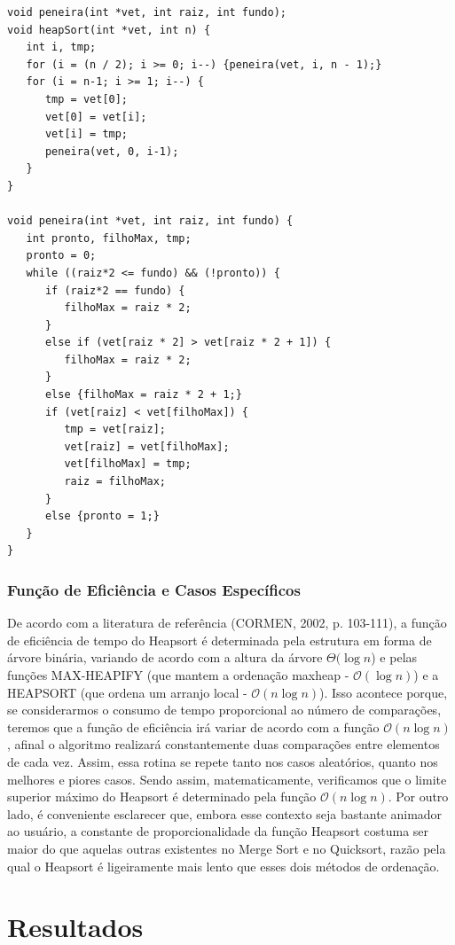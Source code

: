 \documentclass[a4paper, 12pt]{article}
\begin{document}
\begin{verbatim}
void peneira(int *vet, int raiz, int fundo);
void heapSort(int *vet, int n) {
   int i, tmp;
   for (i = (n / 2); i >= 0; i--) {peneira(vet, i, n - 1);}
   for (i = n-1; i >= 1; i--) {
      tmp = vet[0];
      vet[0] = vet[i];
      vet[i] = tmp;
      peneira(vet, 0, i-1);
   }
}

void peneira(int *vet, int raiz, int fundo) {
   int pronto, filhoMax, tmp;
   pronto = 0;
   while ((raiz*2 <= fundo) && (!pronto)) {
      if (raiz*2 == fundo) {
         filhoMax = raiz * 2;
      }
      else if (vet[raiz * 2] > vet[raiz * 2 + 1]) {
         filhoMax = raiz * 2;
      }
      else {filhoMax = raiz * 2 + 1;}
      if (vet[raiz] < vet[filhoMax]) {
         tmp = vet[raiz];
         vet[raiz] = vet[filhoMax];
         vet[filhoMax] = tmp;
         raiz = filhoMax;
      }
      else {pronto = 1;}
   }
}
\end{verbatim}

\subsubsection{Função de Eficiência e Casos Específicos}
\tab{ }De acordo com a literatura de referência (CORMEN, 2002, p. 103-111), a função de eficiência de tempo do Heapsort é determinada pela estrutura em forma de árvore binária, variando de acordo com a altura da árvore $\Theta(\log{}n$) e pelas funções MAX-HEAPIFY (que mantem a ordenação maxheap - $\mathcal{O} (\log{}n)$) e a HEAPSORT (que ordena um arranjo local - $\mathcal{O} (n\log{}n)$). Isso acontece porque, se considerarmos o consumo de tempo proporcional ao número de comparações, teremos que a função de eficiência irá variar de acordo com a função $\mathcal{O} (n\log{}n)$, afinal o algoritmo realizará constantemente duas comparações entre elementos de cada vez. Assim, essa rotina se repete tanto nos casos aleatórios, quanto nos melhores e piores casos. Sendo assim, matematicamente, verificamos que o limite superior máximo do Heapsort é determinado pela função $\mathcal{O} (n\log{}n)$. Por outro lado, é conveniente esclarecer que, embora esse contexto seja bastante animador ao usuário, a constante de proporcionalidade da função Heapsort costuma ser maior do que aquelas outras existentes no Merge Sort e no Quicksort, razão pela qual o Heapsort é ligeiramente mais lento que esses dois métodos de ordenação.

\section{Resultados}
\end{document}
